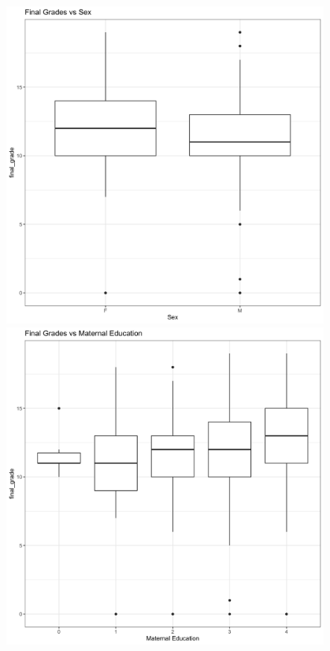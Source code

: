 \documentclass[]{article}
\begin{document}
\includegraphics[width=0.8\textwidth,height=\textheight]{images/Final Grade vs Sex.png}~\includegraphics[width=0.8\textwidth,height=\textheight]{images/Final Grade vs Maternal Education.png}
\end{document}
